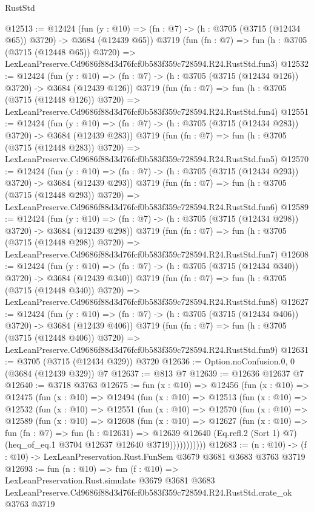 \begin{lexlean}{RustStd}
\begin{coremodule}
@12513 := @12424
    (fun (y : @10) => (fn : @7) -> (h : @3705 (@3715 (@12434 @65)) @3720) -> @3684 (@12439 @65))
    @3719
    (fun (fn : @7) =>
    fun (h : @3705 (@3715 (@12448 @65)) @3720) =>
    LexLeanPreserve.Cd9686f88d3d76fcf0b583f359c728594.R24.RustStd.fun3)
@12532 := @12424
    (fun (y : @10) => (fn : @7) -> (h : @3705 (@3715 (@12434 @126)) @3720) -> @3684 (@12439 @126))
    @3719
    (fun (fn : @7) =>
    fun (h : @3705 (@3715 (@12448 @126)) @3720) =>
    LexLeanPreserve.Cd9686f88d3d76fcf0b583f359c728594.R24.RustStd.fun4)
@12551 := @12424
    (fun (y : @10) => (fn : @7) -> (h : @3705 (@3715 (@12434 @283)) @3720) -> @3684 (@12439 @283))
    @3719
    (fun (fn : @7) =>
    fun (h : @3705 (@3715 (@12448 @283)) @3720) =>
    LexLeanPreserve.Cd9686f88d3d76fcf0b583f359c728594.R24.RustStd.fun5)
@12570 := @12424
    (fun (y : @10) => (fn : @7) -> (h : @3705 (@3715 (@12434 @293)) @3720) -> @3684 (@12439 @293))
    @3719
    (fun (fn : @7) =>
    fun (h : @3705 (@3715 (@12448 @293)) @3720) =>
    LexLeanPreserve.Cd9686f88d3d76fcf0b583f359c728594.R24.RustStd.fun6)
@12589 := @12424
    (fun (y : @10) => (fn : @7) -> (h : @3705 (@3715 (@12434 @298)) @3720) -> @3684 (@12439 @298))
    @3719
    (fun (fn : @7) =>
    fun (h : @3705 (@3715 (@12448 @298)) @3720) =>
    LexLeanPreserve.Cd9686f88d3d76fcf0b583f359c728594.R24.RustStd.fun7)
@12608 := @12424
    (fun (y : @10) => (fn : @7) -> (h : @3705 (@3715 (@12434 @340)) @3720) -> @3684 (@12439 @340))
    @3719
    (fun (fn : @7) =>
    fun (h : @3705 (@3715 (@12448 @340)) @3720) =>
    LexLeanPreserve.Cd9686f88d3d76fcf0b583f359c728594.R24.RustStd.fun8)
@12627 := @12424
    (fun (y : @10) => (fn : @7) -> (h : @3705 (@3715 (@12434 @406)) @3720) -> @3684 (@12439 @406))
    @3719
    (fun (fn : @7) =>
    fun (h : @3705 (@3715 (@12448 @406)) @3720) =>
    LexLeanPreserve.Cd9686f88d3d76fcf0b583f359c728594.R24.RustStd.fun9)
@12631 := @3705 (@3715 (@12434 @329)) @3720
@12636 := Option.noConfusion.{0, 0} (@3684 (@12439 @329)) @7
@12637 := @813 @7
@12639 := @12636 @12637 @7
@12640 := @3718 @3763
@12675 := fun (x : @10) =>
  @12456
    (fun (x : @10) =>
    @12475
      (fun (x : @10) =>
      @12494
        (fun (x : @10) =>
        @12513
          (fun (x : @10) =>
          @12532
            (fun (x : @10) =>
            @12551
              (fun (x : @10) =>
              @12570
                (fun (x : @10) =>
                @12589
                  (fun (x : @10) =>
                  @12608
                    (fun (x : @10) =>
                    @12627
                      (fun (x : @10) =>
                      fun (fn : @7) =>
                      fun (h : @12631) =>
                      @12639
                        @12640
                        (Eq.refl.{2} (Sort 1) @7)
                        (heq_of_eq.{1} @3704 @12637 @12640 @3719)))))))))))
@12683 := (n : @10) -> (f : @10) -> LexLeanPreservation.Rust.FunSem @3679 @3681 @3683 @3763 @3719
@12693 := fun (n : @10) =>
  fun (f : @10) =>
  LexLeanPreservation.Rust.simulate
    @3679
    @3681
    @3683
    LexLeanPreserve.Cd9686f88d3d76fcf0b583f359c728594.R24.RustStd.crate_ok
    @3763
    @3719
\end{coremodule}
\end{lexlean}
